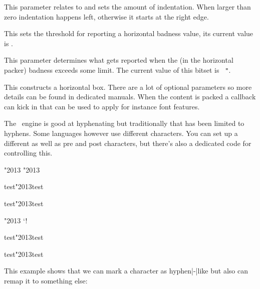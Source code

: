 \stopoldprimitive

\startoldprimitive[title={\prm {hangindent}}]

This parameter relates to  and sets the amount of indentation.
When larger than zero indentation happens left, otherwise it starts at the right
edge.

\stopoldprimitive

\startoldprimitive[title={\prm {hbadness}}]

This sets the threshold for reporting a horizontal badness value, its current
value is \the \badness.

\stopoldprimitive

\startnewprimitive[title={\prm {hbadnessmode}}]

This parameter determines what gets reported when the (in the horizontal packer)
badness exceeds some limit. The current value of this bitset is {\tt
"\tohexadecimal \hbadnessmode}.

\startfourrows
{}
\stopfourrows

\stopnewprimitive

\startoldprimitive[title={\prm {hbox}}]

This constructs a horizontal box. There are a lot of optional parameters so more
details can be found in dedicated manuals. When the content is packed a callback
can kick in that can be used to apply for instance font features.

\stopoldprimitive

\startnewprimitive[title={\prm {hccode}}]

The \TEX\ engine is good at hyphenating but traditionally that has been limited
to hyphens. Some languages however use different characters. You can set up a
different  as well as pre and post characters, but there's also
a dedicated code for controlling this.

\startbuffer
\hccode"2013 "2013

\hsize 50mm test\char"2013test\par
\hsize  1mm test\char"2013test\par

\hccode"2013 `!

\hsize 50mm test\char"2013test\par
\hsize  1mm test\char"2013test\par
\stopbuffer

\typebuffer

This example shows that we can mark a character as hyphen|-|like but also can
remap it to something else:

